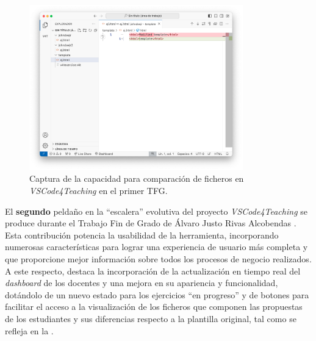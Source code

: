 \begin{figure}[ht!]
    \centering
    \includegraphics[width=0.825\textwidth]{imagenes/utilizadas/1-introduccion/historia-tfg1-comparacionFicheros.png}
    \caption{Captura de la capacidad para comparación de ficheros en \textit{VSCode4Teaching} en el primer TFG.}
    \label{fig:historiaProyecto1Comparacion}
\end{figure}


El \textbf{segundo} peldaño en la ``escalera'' evolutiva del proyecto \textit{VSCode4Teaching} se produce durante el Trabajo Fin de Grado de Álvaro Justo Rivas Alcobendas \cite{TFG_Alvaro}. Esta contribución potencia la usabilidad de la herramienta, incorporando numerosas características para lograr una experiencia de usuario más completa y que proporcione mejor información sobre todos los procesos de negocio realizados. A este respecto, destaca la incorporación de la actualización en tiempo real del \textit{dashboard} de los docentes y una mejora en su apariencia y funcionalidad, dotándolo de un nuevo estado para los ejercicios ``en progreso'' y de botones para facilitar el acceso a la visualización de los ficheros que componen las propuestas de los estudiantes y sus diferencias respecto a la plantilla original, tal como se refleja en la .

